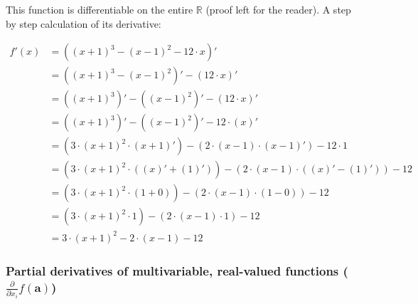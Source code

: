 \documentclass[titlepage]{article}
\begin{document}
            This function is differentiable on the entire $\mathbb{R}$ (proof
            left for the reader). A step by step calculation of its derivative:

            \begin{align*}
              f'(x) & = \left( (x+1)^3 - (x-1)^2 - 12 \cdot x \right)' \\
                    & = \left( (x+1)^3 - (x-1)^2 \right)' - (12 \cdot x)' \\
                    & = \left( (x+1)^3 \right)'
                        -
                        \left( (x-1)^2 \right)'
                        - (12 \cdot x)' \\
                    & = \left( (x+1)^3 \right)'
                        -
                        \left( (x-1)^2 \right)'
                        - 12 \cdot (x)' \\
                    & = \left( 3 \cdot (x+1)^2 \cdot (x+1)' \right)
                        -
                        \left( 2 \cdot (x-1) \cdot (x-1)' \right)
                        - 12 \cdot 1 \\
                    & = \left(
                          3 \cdot (x+1)^2 \cdot \left( (x)' + (1)' \right)
                        \right)
                        -
                        \left(
                          2 \cdot (x-1) \cdot \left( (x)' - (1)' \right)
                        \right)
                        - 12 \\
                    & = \left(
                          3 \cdot (x+1)^2 \cdot \left( 1 + 0 \right)
                        \right)
                        -
                        \left(
                          2 \cdot (x-1) \cdot \left( 1 - 0 \right)
                        \right)
                        - 12 \\
                    & = \left( 3 \cdot (x+1)^2 \cdot 1 \right)
                        -
                        \left( 2 \cdot (x-1) \cdot 1 \right)
                        - 12 \\
                    & = 3 \cdot (x+1)^2 - 2 \cdot (x-1) - 12
            \end{align*}

        \subsubsection{%
          Partial derivatives of multivariable, real-valued functions
          ($\frac{\partial}{\partial x_i} f(\mathbf{a})$)
        }
\end{document}
